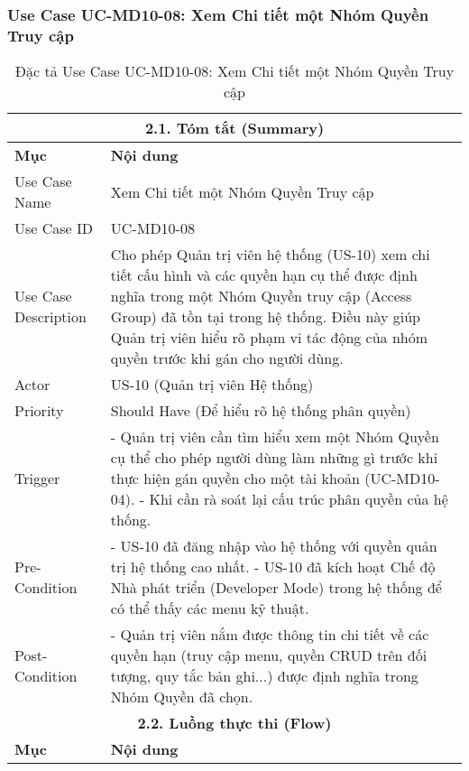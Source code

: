 \subsubsection{Use Case UC-MD10-08: Xem Chi tiết một Nhóm Quyền Truy cập}
\begin{longtable}{|m{4cm}|p{11cm}|}
\caption{Đặc tả Use Case UC-MD10-08: Xem Chi tiết một Nhóm Quyền Truy cập} \label{tab:uc_md10_08_full_v2_latex_fixed_in_codeblock} \\
\hline
\multicolumn{2}{|c|}{\textbf{2.1. Tóm tắt (Summary)}} \\
\hline
\textbf{Mục} & \textbf{Nội dung} \\
\hline
\endhead %
\midrule
\endfoot %
\bottomrule
\endlastfoot %
Use Case Name & Xem Chi tiết một Nhóm Quyền Truy cập \\
\hline
Use Case ID & UC-MD10-08 \\
\hline
Use Case Description & Cho phép Quản trị viên hệ thống (US-10) xem chi tiết cấu hình và các quyền hạn cụ thể được định nghĩa trong một Nhóm Quyền truy cập (Access Group) đã tồn tại trong hệ thống. Điều này giúp Quản trị viên hiểu rõ phạm vi tác động của nhóm quyền trước khi gán cho người dùng. \\
\hline
Actor & US-10 (Quản trị viên Hệ thống) \\
\hline
Priority & Should Have (Để hiểu rõ hệ thống phân quyền) \\
\hline
Trigger & - Quản trị viên cần tìm hiểu xem một Nhóm Quyền cụ thể cho phép người dùng làm những gì trước khi thực hiện gán quyền cho một tài khoản (UC-MD10-04). \newline - Khi cần rà soát lại cấu trúc phân quyền của hệ thống. \\
\hline
Pre-Condition & - US-10 đã đăng nhập vào hệ thống với quyền quản trị hệ thống cao nhất. \newline - US-10 đã kích hoạt Chế độ Nhà phát triển (Developer Mode) trong hệ thống để có thể thấy các menu kỹ thuật. \\
\hline
Post-Condition & - Quản trị viên nắm được thông tin chi tiết về các quyền hạn (truy cập menu, quyền CRUD trên đối tượng, quy tắc bản ghi...) được định nghĩa trong Nhóm Quyền đã chọn. \\
\hline
\multicolumn{2}{|c|}{\textbf{2.2. Luồng thực thi (Flow)}} \\
\hline
\textbf{Mục} & \textbf{Nội dung} \\
\hline

\end{longtable}
